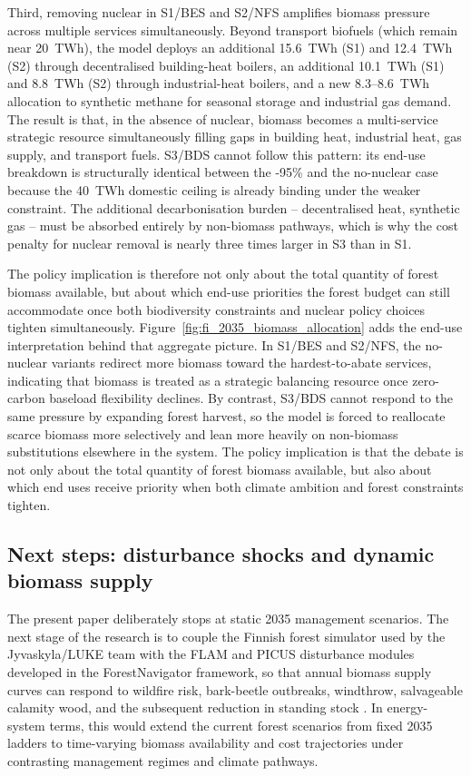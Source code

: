 \documentclass{article}
\begin{document}
Third, removing nuclear in S1/BES and S2/NFS amplifies biomass pressure across multiple services simultaneously. Beyond transport biofuels (which remain near 20~TWh), the model deploys an additional 15.6~TWh (S1) and 12.4~TWh (S2) through decentralised building-heat boilers, an additional 10.1~TWh (S1) and 8.8~TWh (S2) through industrial-heat boilers, and a new 8.3--8.6~TWh allocation to synthetic methane for seasonal storage and industrial gas demand. The result is that, in the absence of nuclear, biomass becomes a multi-service strategic resource simultaneously filling gaps in building heat, industrial heat, gas supply, and transport fuels. S3/BDS cannot follow this pattern: its end-use breakdown is structurally identical between the -95\% and the no-nuclear case because the 40~TWh domestic ceiling is already binding under the weaker constraint. The additional decarbonisation burden -- decentralised heat, synthetic gas -- must be absorbed entirely by non-biomass pathways, which is why the cost penalty for nuclear removal is nearly three times larger in S3 than in S1.

The policy implication is therefore not only about the total quantity of forest biomass available, but about which end-use priorities the forest budget can still accommodate once both biodiversity constraints and nuclear policy choices tighten simultaneously.
Figure~\ref{fig:fi_2035_biomass_allocation} adds the end-use interpretation behind that aggregate picture. In S1/BES and S2/NFS, the no-nuclear variants redirect more biomass toward the hardest-to-abate services, indicating that biomass is treated as a strategic balancing resource once zero-carbon baseload flexibility declines. By contrast, S3/BDS cannot respond to the same pressure by expanding forest harvest, so the model is forced to reallocate scarce biomass more selectively and lean more heavily on non-biomass substitutions elsewhere in the system. The policy implication is that the debate is not only about the total quantity of forest biomass available, but also about which end uses receive priority when both climate ambition and forest constraints tighten.

\subsection{Next steps: disturbance shocks and dynamic biomass supply}

The present paper deliberately stops at static 2035 management scenarios. The next stage of the research is to couple the Finnish forest simulator used by the Jyvaskyla/LUKE team with the FLAM and PICUS disturbance modules developed in the ForestNavigator framework, so that annual biomass supply curves can respond to wildfire risk, bark-beetle outbreaks, windthrow, salvageable calamity wood, and the subsequent reduction in standing stock \citep{venalainenClimateChangeInduces2020,hlasnyDevastatingOutbreakBark2021,tothImpactsCalamityLogging2020}. In energy-system terms, this would extend the current forest scenarios from fixed 2035 ladders to time-varying biomass availability and cost trajectories under contrasting management regimes and climate pathways.
\end{document}
